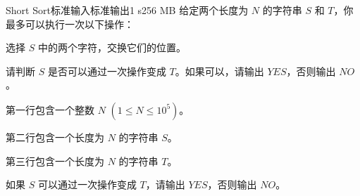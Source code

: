 \begin{problem}{Short Sort}{标准输入}{标准输出}{1 s}{256 MB}
给定两个长度为 $N$ 的字符串 $S$ 和 $T$，你最多可以执行一次以下操作：

选择 $S$ 中的两个字符，交换它们的位置。

请判断 $S$ 是否可以通过一次操作变成 $T$。如果可以，请输出 $YES$，否则输出 $NO$。

\InputFile
第一行包含一个整数 $N$ $(1 \leq N \leq 10^5)$。

第二行包含一个长度为 $N$ 的字符串 $S$。

第三行包含一个长度为 $N$ 的字符串 $T$。

\OutputFile
如果 $S$ 可以通过一次操作变成 $T$，请输出 $YES$，否则输出 $NO$。

\Example

\begin{example}
\end{example}

\end{problem}
